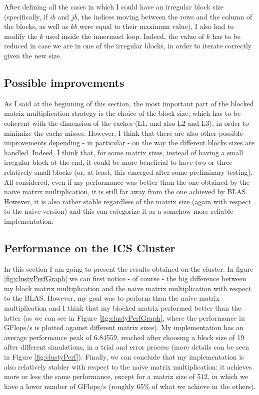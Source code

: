 \documentclass[unicode,11pt,a4paper,oneside,numbers=endperiod,openany]{scrartcl}
\begin{document}
After defining all the cases in which I could have an irregular block size (specifically, if $ib$ and $jb$, the indices moving between the rows and the column of the blocks, as well as $kb$ were equal to their maximum value), I also had to modify the $k$ used inside the innermost loop. Indeed, the value of $k$ has to be reduced in case we are in one of the irregular blocks, in order to iterate correctly given the new size. 

\subsection{Possible improvements}
As I said at the beginning of this section, the most important part of the blocked matrix multiplication strategy is the choice of the block size, which has to be coherent with the dimension of the caches (L1, and also L2 and L3), in order to minimize the cache misses. However, I think that there are also other possible improvements depending - in particular - on the way the different blocks sizes are handled. Indeed, I think that, for some matrix sizes, instead of having a small irregular block at the end, it could be more beneficial to have two or three relatively small blocks (or, at least, this emerged after some preliminary testing). All considered, even if my performance was better than the one obtained by the naive matrix multiplication, it is still far away from the one achieved by BLAS. However, it is also rather stable regardless of the matrix size (again with respect to the naive version) and this can categorize it as a somehow more reliable implementation.

\subsection{Performance on the ICS Cluster}
In this section I am going to present the results obtained on the cluster. In figure \ref{fig:clustyPerfGraph} we can first notice - of course - the big difference between my block matrix multiplication and the naive matrix multiplication with respect to the BLAS. However, my goal was to perform than the naive matrix multiplication and I think that my blocked matrix performed better than the latter (as we can see in Figure \ref{fig:clustyPerfGraph}, where the performance in GFlops/s is plotted against different matrix sizes). My implementation has an average performance peak of 6.84559, reached after choosing a block size of 19 after different simulations, in a trial and error process (more details can be seen in Figure \ref{fig:clustyPerf}). Finally, we can conclude that my implementation is also relatively stabler with respect to the naive matrix multiplication: it achieves more or less the same performance, except for a matrix size of 512, in which we have a lower number of GFlops/s (roughly 65\% of what we achieve in the others).
\end{document}
